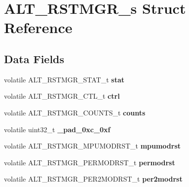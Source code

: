 \hypertarget{structALT__RSTMGR__s}{}\section{A\+L\+T\+\_\+\+R\+S\+T\+M\+G\+R\+\_\+s Struct Reference}
\label{structALT__RSTMGR__s}
\subsection*{Data Fields}
\begin{DoxyCompactItemize}
\item 
\mbox{\label{structALT__RSTMGR__s_aa3bb195948028cd7c20fcb1099109030}} 
volatile A\+L\+T\+\_\+\+R\+S\+T\+M\+G\+R\+\_\+\+S\+T\+A\+T\+\_\+t {\bfseries stat}
\item 
\mbox{\label{structALT__RSTMGR__s_a5f4463109a288faba24f17a8a3e66e8f}} 
volatile A\+L\+T\+\_\+\+R\+S\+T\+M\+G\+R\+\_\+\+C\+T\+L\+\_\+t {\bfseries ctrl}
\item 
\mbox{\label{structALT__RSTMGR__s_a7b1cfa7728b7488d480c9370ed2c43a4}} 
volatile A\+L\+T\+\_\+\+R\+S\+T\+M\+G\+R\+\_\+\+C\+O\+U\+N\+T\+S\+\_\+t {\bfseries counts}
\item 
\mbox{\label{structALT__RSTMGR__s_ad62aa2f9854385b5e456e49561eb83ef}} 
volatile uint32\+\_\+t {\bfseries \+\_\+pad\+\_\+0xc\+\_\+0xf}
\item 
\mbox{\label{structALT__RSTMGR__s_ad702603f78dfa6677db0eb2da345d76d}} 
volatile A\+L\+T\+\_\+\+R\+S\+T\+M\+G\+R\+\_\+\+M\+P\+U\+M\+O\+D\+R\+S\+T\+\_\+t {\bfseries mpumodrst}
\item 
\mbox{\label{structALT__RSTMGR__s_adee784df3a7cbb9bfab5a9a911206bcc}} 
volatile A\+L\+T\+\_\+\+R\+S\+T\+M\+G\+R\+\_\+\+P\+E\+R\+M\+O\+D\+R\+S\+T\+\_\+t {\bfseries permodrst}
\item 
\mbox{\label{structALT__RSTMGR__s_ac912fed32c35e05bb496a22bb88adccf}} 
volatile A\+L\+T\+\_\+\+R\+S\+T\+M\+G\+R\+\_\+\+P\+E\+R2\+M\+O\+D\+R\+S\+T\+\_\+t {\bfseries per2modrst}
\item 
\mbox{\label{structALT__RSTMGR__s_aad7dcd6e6e0b18de71bfa49dd1bae94c}} 

\end{DoxyCompactItemize}
